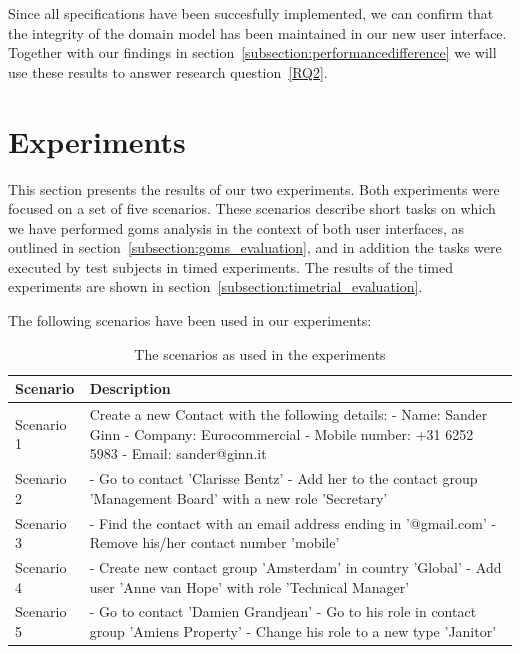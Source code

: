 Since all specifications have been succesfully implemented, we can confirm that the integrity of the domain model has been maintained in our new user interface. Together with our findings in section~\ref{subsection:performancedifference} we will use these results to answer research question~\ref{RQ2}.

\section{Experiments}
\label{section:experiments_evaluation}
This section presents the results of our two experiments. Both experiments were focused on a set of five scenarios. These scenarios describe short tasks on which we have performed \acrshort{goms} analysis in the context of both user interfaces, as outlined in section~\ref{subsection:goms_evaluation}, and in addition the tasks were executed by test subjects in timed experiments. The results of the timed experiments are shown in section~\ref{subsection:timetrial_evaluation}.

The following scenarios have been used in our experiments:
\begin{table}[H]
	\center
	
	\begin{tabularx}{\textwidth}{lX}
		\toprule
		Scenario		&	Description \\
		\midrule
		Scenario 1	& Create a new Contact with the following details: \newline
								- Name: Sander Ginn \newline
								- Company: Eurocommercial \newline
								- Mobile number: +31 6252 5983 \newline
								- Email: sander@ginn.it \newline \\
		Scenario 2	& 	- Go to contact 'Clarisse Bentz' \newline
								- Add her to the contact group 'Management Board' with a new role 'Secretary' \newline \\
		Scenario 3	& 	- Find the contact with an email address ending in '@gmail.com' \newline
								- Remove his/her contact number 'mobile' \newline \\
		Scenario 4	&	- Create new contact group 'Amsterdam' in country 'Global' \newline
								- Add user 'Anne van Hope' with role 'Technical Manager' \newline \\
		Scenario 5	&	- Go to contact 'Damien Grandjean' \newline
								- Go to his role in contact group 'Amiens Property' \newline
								- Change his role to a new type 'Janitor'\\
		\bottomrule
	\end{tabularx}
	
	\caption{The scenarios as used in the experiments}
	\label{table:scenarios}
\end{table}


